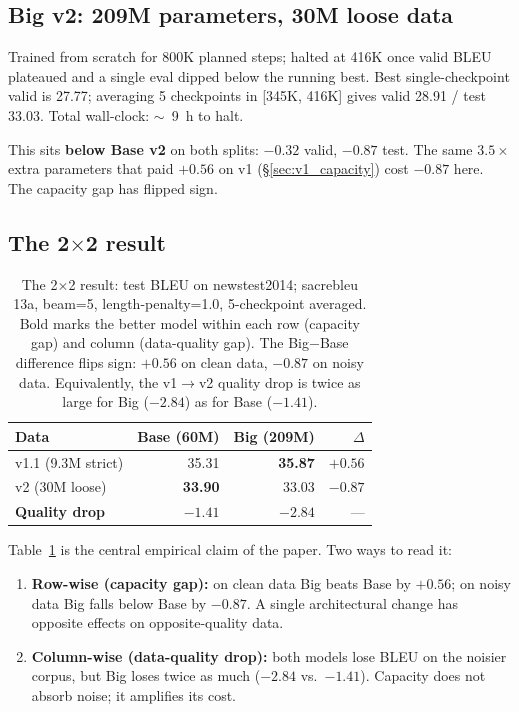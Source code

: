 \subsection{Big v2: 209M parameters, 30M loose data}
\label{sec:big_v2}
Trained from scratch for 800K planned steps; halted at 416K once valid BLEU plateaued and a single eval dipped below the running best. Best single-checkpoint valid is 27.77; averaging 5 checkpoints in [345K, 416K] gives valid 28.91 / test 33.03. Total wall-clock: $\sim$~9~h to halt.

This sits \textbf{below Base v2} on both splits: $-0.32$ valid, $-0.87$ test. The same $3.5\times$ extra parameters that paid $+0.56$ on v1 (\S\ref{sec:v1_capacity}) cost $-0.87$ here. The capacity gap has flipped sign.

\subsection{The 2$\times$2 result}
\label{sec:two_by_two}

\begin{table}[t]
\centering
\small
\begin{tabular}{lrrr}
\toprule
\textbf{Data} & \textbf{Base (60M)} & \textbf{Big (209M)} & \textbf{$\Delta$} \\
\midrule
v1.1 (9.3M strict) & 35.31 & \textbf{35.87} & $\mathbf{+0.56}$ \\
v2 (30M loose)     & \textbf{33.90} & 33.03 & $\mathbf{-0.87}$ \\
\midrule
\textbf{Quality drop} & $-1.41$ & $-2.84$ & --- \\
\bottomrule
\end{tabular}
\caption{The 2$\times$2 result: test BLEU on newstest2014; sacrebleu 13a, beam=5, length-penalty=1.0, 5-checkpoint averaged. Bold marks the better model within each row (capacity gap) and column (data-quality gap). The Big$-$Base difference flips sign: $+0.56$ on clean data, $-0.87$ on noisy data. Equivalently, the v1$\rightarrow$v2 quality drop is twice as large for Big ($-2.84$) as for Base ($-1.41$).}
\label{tab:two_by_two}
\end{table}

Table~\ref{tab:two_by_two} is the central empirical claim of the paper. Two ways to read it:
\begin{enumerate}
\item \textbf{Row-wise (capacity gap):} on clean data Big beats Base by $+0.56$; on noisy data Big falls below Base by $-0.87$. A single architectural change has opposite effects on opposite-quality data.
\item \textbf{Column-wise (data-quality drop):} both models lose BLEU on the noisier corpus, but Big loses twice as much ($-2.84$ vs.\ $-1.41$). Capacity does not absorb noise; it amplifies its cost.
\end{enumerate}

